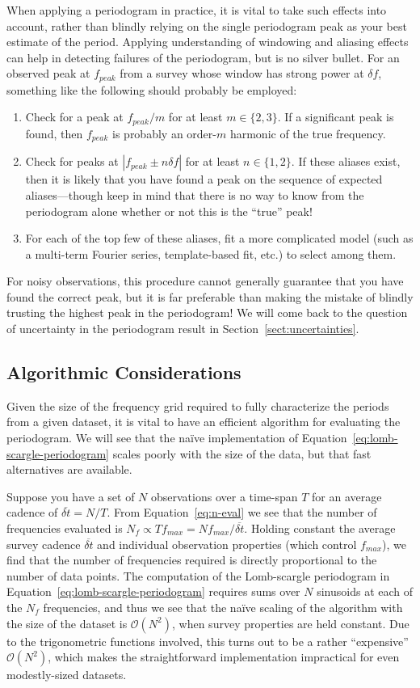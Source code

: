 \documentclass[preprint]{aastex}
\newcommand{\Eq}[1]{Equation~\ref{eq:#1}}
\newcommand{\eq}[1]{\Eq{#1}}
\newcommand{\Sect}[1]{Section~\ref{sect:#1}}
\newcommand{\sect}[1]{\Sect{#1}}
\newcommand{\sectlabel}[1]{\label{sect:#1}}
\begin{document}
When applying a periodogram in practice, it is vital to take such effects into
account, rather than blindly relying on the single periodogram peak as your
best estimate of the period.
Applying understanding of windowing and aliasing effects can help in detecting
failures of the periodogram, but is no silver bullet.
For an observed peak at $f_{peak}$ from a survey whose window has strong power
at $\delta f$, something like the following should probably be employed:
\begin{enumerate}
  \item Check for a peak at $f_{peak}/m$ for at least $m \in \{2, 3\}$.
    If a significant peak is found, then $f_{peak}$ is probably an order-$m$
    harmonic of the true frequency.
  \item Check for peaks at $|f_{peak} \pm n\delta f|$ for at least
    $n \in \{1, 2\}$. If these aliases exist, then it is likely that you have
    found a peak on the sequence of expected aliases---though keep in mind that
    there is no way to know from the periodogram alone whether or not
    this is the ``true'' peak!
  \item For each of the top few of these aliases, fit a more complicated model
    (such as a multi-term Fourier series, template-based fit, etc.) to select
    among them.
\end{enumerate}
For noisy observations, this procedure cannot generally guarantee that you
have found the correct peak, but it is far preferable than making the mistake
of blindly trusting the highest peak in the periodogram!
We will come back to the question of uncertainty in the periodogram result
in \sect{uncertainties}.


\subsection{Algorithmic Considerations}
\sectlabel{algorithmic-considerations}
Given the size of the frequency grid required to fully characterize the periods
from a given dataset, it is vital to have an efficient algorithm for evaluating
the periodogram. We will see that the na{\"i}ve implementation of
\eq{lomb-scargle-periodogram} scales poorly with the size of the data, but that
fast alternatives are available.

Suppose you have a set of $N$ observations over a time-span $T$ for an average
cadence of $\overline{\delta t} = N/T$.
From \eq{n-eval} we see that the number of frequencies evaluated is
$N_f \propto T f_{max} = N f_{max} / \overline{\delta t}$.
Holding constant the average survey cadence $\overline{\delta t}$ and individual
observation properties (which control $f_{max}$), we find that the number of
frequencies required is directly proportional to the number of data points.
The computation of the Lomb-scargle periodogram in \eq{lomb-scargle-periodogram}
requires sums over $N$ sinusoids at each of the
$N_f$ frequencies, and thus we see that the
na{\"i}ve scaling of the algorithm with the size of the dataset is
$\mathcal{O}(N^2)$, when survey properties are held constant.
Due to the trigonometric functions involved, this turns out to be a rather
``expensive'' $\mathcal{O}(N^2)$, which makes the straightforward
implementation impractical for even modestly-sized datasets.
\end{document}
